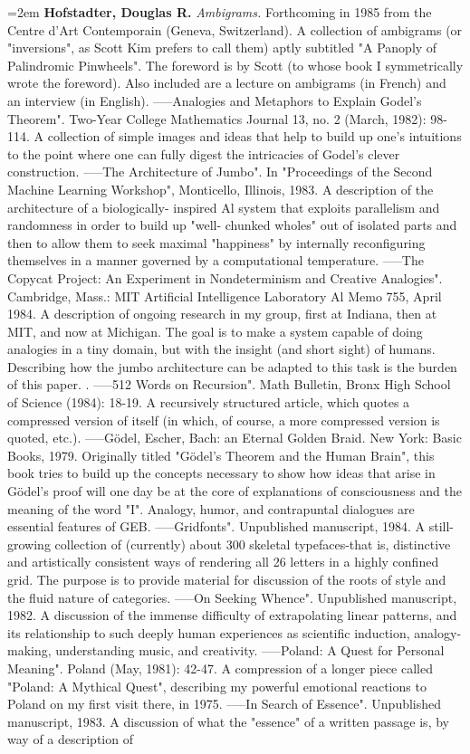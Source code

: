 \par\noindent\hangindent=2em {\bf Hofstadter, Douglas R.} {\it Ambigrams.} Forthcoming in 1985 from the Centre d'Art Contemporain (Geneva, Switzerland). A collection of ambigrams (or "inversions", as Scott Kim prefers to call them) aptly subtitled "A Panoply of Palindromic Pinwheels". The foreword is by Scott (to whose book I symmetrically wrote the foreword). Also included are a lecture on ambigrams (in French) and an interview (in English). -----Analogies and Metaphors to Explain Godel's Theorem". Two-Year College Mathematics Journal 13, no. 2 (March, 1982): 98-114. A collection of simple images and ideas that help to build up one's intuitions to the point where one can fully digest the intricacies of Godel's clever construction. -----The Architecture of Jumbo". In "Proceedings of the Second Machine Learning Workshop", Monticello, Illinois, 1983. A description of the architecture of a biologically- inspired Al system that exploits parallelism and randomness in order to build up "well- chunked wholes" out of isolated parts and then to allow them to seek maximal "happiness" by internally reconfiguring themselves in a manner governed by a computational temperature. -----The Copycat Project: An Experiment in Nondeterminism and Creative Analogies". Cambridge, Mass.: MIT Artificial Intelligence Laboratory Al Memo 755, April 1984. A description of ongoing research in my group, first at Indiana, then at MIT, and now at Michigan. The goal is to make a system capable of doing analogies in a tiny domain, but with the insight (and short sight) of humans. Describing how the jumbo architecture can be adapted to this task is the burden of this paper. . -----512 Words on Recursion". Math Bulletin, Bronx High School of Science (1984): 18-19. A recursively structured article, which quotes a compressed version of itself (in which, of course, a more compressed version is quoted, etc.). -----Gödel, Escher, Bach: an Eternal Golden Braid. New York: Basic Books, 1979. Originally titled "Gödel’s Theorem and the Human Brain", this book tries to build up the concepts necessary to show how ideas that arise in Gödel’s proof will one day be at the core of explanations of consciousness and the meaning of the word "I". Analogy, humor, and contrapuntal dialogues are essential features of GEB. -----Gridfonts". Unpublished manuscript, 1984. A still-growing collection of (currently) about 300 skeletal typefaces-that is, distinctive and artistically consistent ways of rendering all 26 letters in a highly confined grid. The purpose is to provide material for discussion of the roots of style and the fluid nature of categories. -----On Seeking Whence". Unpublished manuscript, 1982. A discussion of the immense difficulty of extrapolating linear patterns, and its relationship to such deeply human experiences as scientific induction, analogy-making, understanding music, and creativity. -----Poland: A Quest for Personal Meaning". Poland (May, 1981): 42-47. A compression of a longer piece called "Poland: A Mythical Quest", describing my powerful emotional reactions to Poland on my first visit there, in 1975. -----In Search of Essence". Unpublished manuscript, 1983. A discussion of what the "essence" of a written passage is, by way of a description of 